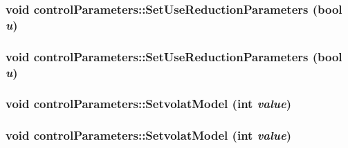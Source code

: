 \label{classcontrol_parameters_a53e0b5bcf58eea96908fd3b974e4dd15}
\hypertarget{classcontrol_parameters_ab3723111e5bbd3b9a8784182b39f8a36}{
\subsubsection[{SetUseReductionParameters}]{\setlength{\rightskip}{0pt plus 5cm}void controlParameters::SetUseReductionParameters (bool {\em u})}}
\label{classcontrol_parameters_ab3723111e5bbd3b9a8784182b39f8a36}
\hypertarget{classcontrol_parameters_ab3723111e5bbd3b9a8784182b39f8a36}{
\subsubsection[{SetUseReductionParameters}]{\setlength{\rightskip}{0pt plus 5cm}void controlParameters::SetUseReductionParameters (bool {\em u})}}
\label{classcontrol_parameters_ab3723111e5bbd3b9a8784182b39f8a36}
\hypertarget{classcontrol_parameters_a41cbb9fab54ae32c76dbf36104dd14e9}{
\subsubsection[{SetvolatModel}]{\setlength{\rightskip}{0pt plus 5cm}void controlParameters::SetvolatModel (int {\em value})}}
\label{classcontrol_parameters_a41cbb9fab54ae32c76dbf36104dd14e9}
\hypertarget{classcontrol_parameters_a41cbb9fab54ae32c76dbf36104dd14e9}{
\subsubsection[{SetvolatModel}]{\setlength{\rightskip}{0pt plus 5cm}void controlParameters::SetvolatModel (int {\em value})}}
